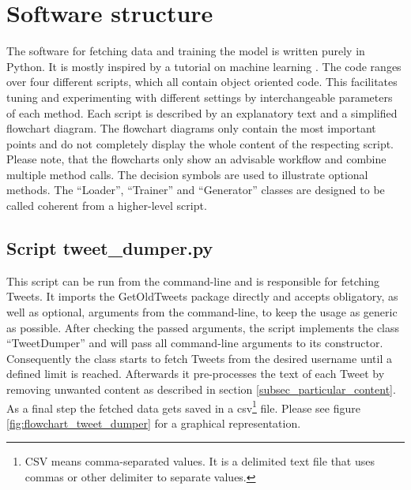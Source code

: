 \documentclass[hidelinks, conference]{IEEEtran}
\begin{document}
\section{Software structure}

The software for fetching data and training the model is written purely in Python. It is mostly inspired by a tutorial on machine learning \cite{tutrob}. The code ranges over four different scripts, which all contain object oriented code. This facilitates tuning and experimenting with different settings by interchangeable parameters of each method. Each script is described by an explanatory text and a simplified flowchart diagram. The flowchart diagrams only contain the most important points and do not completely display the whole content of the respecting script. Please note, that the flowcharts only show an advisable workflow and combine multiple method calls. The decision symbols are used to illustrate optional methods. The ``Loader'', ``Trainer'' and ``Generator'' classes are designed to be called coherent from a higher-level script.

\subsection{Script tweet\_dumper.py}

This script can be run from the command-line and is responsible for fetching Tweets. It imports the GetOldTweets package directly and accepts obligatory, as well as optional, arguments from the command-line, to keep the usage as generic as possible. After checking the passed arguments, the script implements the class ``TweetDumper'' and will pass all command-line arguments to its constructor. Consequently the class starts to fetch Tweets from the desired username until a defined limit is reached. Afterwards it pre-processes the text of each Tweet by removing unwanted content as described in section \ref{subsec_particular_content}. As a final step the fetched data gets saved in a csv\footnote{CSV means comma-separated values. It is a delimited text file that uses commas or other delimiter to separate values.} file. Please see figure \ref{fig:flowchart_tweet_dumper} for a graphical representation.
\end{document}

